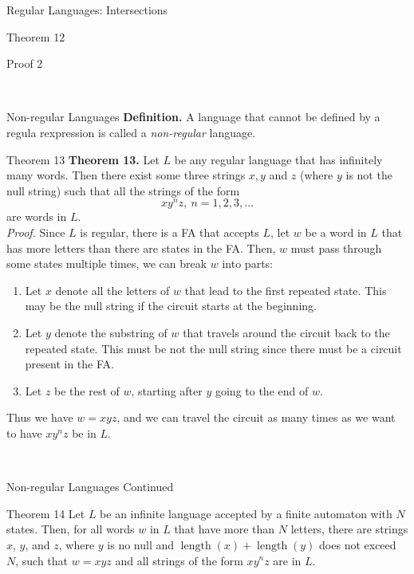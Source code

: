 \documentclass{article}
\DeclareMathOperator{\length}{length}
\begin{document}
\begin{multicols*}{3}
\begin{blackbox}{Regular Languages: Intersections}
\begin{redbox}{Theorem 12}
\begin{pinkbox}{Proof 2}
        \end{pinkbox}
    \end{redbox}\\[-2ex]
\end{blackbox}
\begin{blackbox}{Non-regular Languages}
    \textbf{Definition.} A language that cannot be defined by a regula rexpression is called a \emph{non-regular} language.
    \begin{redbox}{Theorem 13}
        \textbf{Theorem 13.} Let $L$ be any regular language that has infinitely many words. Then there exist some three strings $x,y$ and $z$ (where $y$ is not the null string) such that all the strings of the form \\[-0.5ex]
        \[xy^nz, \ n = 1,2,3,\ldots\]
        are words in $L$.\\[1ex]
        \textit{Proof.} Since $L$ is regular, there is a FA that accepts $L$, let $w$ be a word in $L$ that has more letters than there are states in the FA. Then, $w$ must pass through some states multiple times, we can break $w$ into parts:
        \begin{enumerate}[leftmargin=10pt]
            \item Let $x$ denote all the letters of $w$ that lead to the first repeated state. This may be the null string if the circuit starts at the beginning.
            \item Let $y$ denote the substring of $w$ that travels around the circuit back to the repeated state. This must be not the null string since there must be a circuit present in the FA.
            \item Let $z$ be the rest of $w$, starting after $y$ going to the end of $w$.
        \end{enumerate}
        Thus we have $w = xyz$, and we can travel the circuit as many times as we want to have $xy^nz$ be in $L$.
    \end{redbox}\\[-2ex]
\end{blackbox}
\begin{blackbox}{Non-regular Languages Continued}
    \begin{brownbox}{Theorem 14}
        Let $L$ be an infinite language accepted by a finite automaton with $N$ states. Then, for all words $w$ in $L$ that have more than $N$ letters, there are strings $x$, $y$, and $z$, where $y$ is no null and $\length(x) + \length(y)$ does not exceed $N$, such that $w = xyz$ and all strings of the form $xy^nz$ are in $L$.

\end{brownbox}
\end{blackbox}
\end{multicols*}
\end{document}
